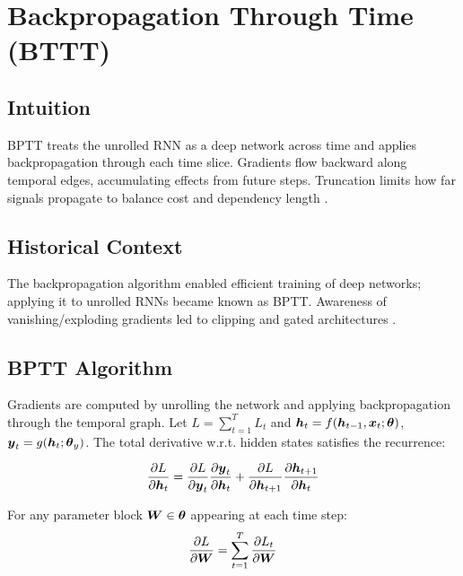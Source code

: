 
\section{Backpropagation Through Time (BTTT)}
\label{sec:bptt}

\subsection*{Intuition}

BPTT treats the unrolled RNN as a deep network across time and applies backpropagation through each time slice. Gradients flow backward along temporal edges, accumulating effects from future steps. Truncation limits how far signals propagate to balance cost and dependency length \cite{GoodfellowEtAl2016}.

\subsection*{Historical Context}

The backpropagation algorithm \cite{Rumelhart1986} enabled efficient training of deep networks; applying it to unrolled RNNs became known as BPTT. Awareness of vanishing/exploding gradients led to clipping and gated architectures \cite{GoodfellowEtAl2016,Hochreiter1997}.


\subsection{BPTT Algorithm}

Gradients are computed by unrolling the network and applying backpropagation through the temporal graph. Let $L=\sum_{t=1}^{T} L_t$ and $\boldsymbol{h}_t = f(\boldsymbol{h}_{t-1}, \boldsymbol{x}_t; \boldsymbol{\theta})$, $\boldsymbol{y}_t = g(\boldsymbol{h}_t; \boldsymbol{\theta}_y)$. The total derivative w.r.t. hidden states satisfies the recurrence:

\begin{equation}
\frac{\partial L}{\partial \boldsymbol{h}_t} = \frac{\partial L}{\partial \boldsymbol{y}_t} \frac{\partial \boldsymbol{y}_t}{\partial \boldsymbol{h}_t} + \frac{\partial L}{\partial \boldsymbol{h}_{t+1}} \frac{\partial \boldsymbol{h}_{t+1}}{\partial \boldsymbol{h}_t}
\end{equation}

For any parameter block $\boldsymbol{W} \in \boldsymbol{\theta}$ appearing at each time step:
\begin{equation}
\frac{\partial L}{\partial \boldsymbol{W}} = \sum_{t=1}^{T} \frac{\partial L_t}{\partial \boldsymbol{W}}
\end{equation}

